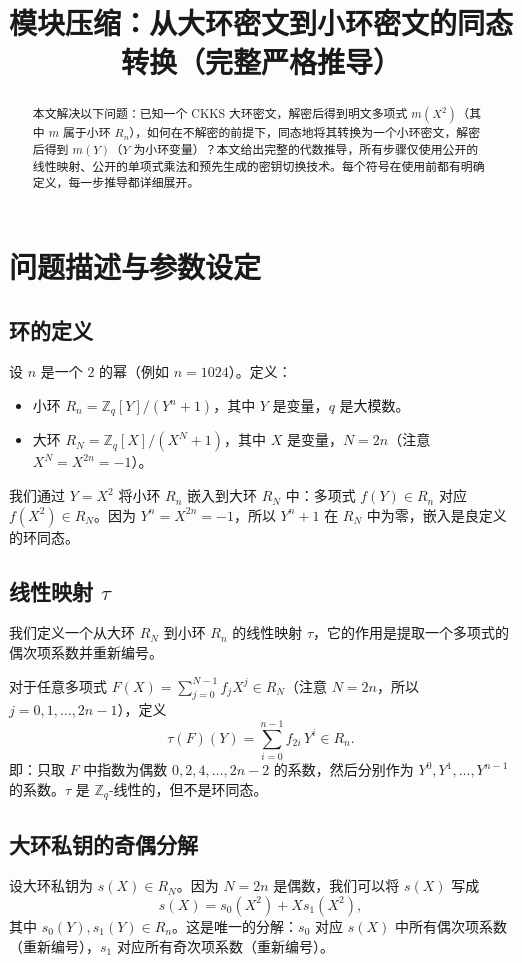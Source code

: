 \documentclass{article}
\title{模块压缩：从大环密文到小环密文的同态转换（完整严格推导）}
\author{}
\date{}
\begin{document}
\maketitle

\begin{abstract}
  本文解决以下问题：已知一个 CKKS 大环密文，解密后得到明文多项式 $m(X^2)$（其中 $m$ 属于小环 $R_n$），如何在不解密的前提下，同态地将其转换为一个小环密文，解密后得到 $m(Y)$（$Y$ 为小环变量）？本文给出完整的代数推导，所有步骤仅使用公开的线性映射、公开的单项式乘法和预先生成的密钥切换技术。每个符号在使用前都有明确定义，每一步推导都详细展开。
\end{abstract}

\section{问题描述与参数设定}

\subsection{环的定义}
设 $n$ 是一个 $2$ 的幂（例如 $n=1024$）。定义：
\begin{itemize}
  \item 小环 $R_n = \mathbb{Z}_q[Y] / (Y^n + 1)$，其中 $Y$ 是变量，$q$ 是大模数。
  \item 大环 $R_N = \mathbb{Z}_q[X] / (X^N + 1)$，其中 $X$ 是变量，$N = 2n$（注意 $X^N = X^{2n} = -1$）。
\end{itemize}
我们通过 $Y = X^2$ 将小环 $R_n$ 嵌入到大环 $R_N$ 中：多项式 $f(Y) \in R_n$ 对应 $f(X^2) \in R_N$。因为 $Y^n = X^{2n} = -1$，所以 $Y^n+1$ 在 $R_N$ 中为零，嵌入是良定义的环同态。

\subsection{线性映射 $\tau$}
我们定义一个从大环 $R_N$ 到小环 $R_n$ 的线性映射 $\tau$，它的作用是提取一个多项式的偶次项系数并重新编号。

对于任意多项式 $F(X) = \sum_{j=0}^{N-1} f_j X^j \in R_N$（注意 $N=2n$，所以 $j=0,1,\dots,2n-1$），定义
\[
\tau(F)(Y) = \sum_{i=0}^{n-1} f_{2i} \, Y^i \in R_n.
\]
即：只取 $F$ 中指数为偶数 $0,2,4,\dots,2n-2$ 的系数，然后分别作为 $Y^0, Y^1, \dots, Y^{n-1}$ 的系数。$\tau$ 是 $\mathbb{Z}_q$-线性的，但不是环同态。

\subsection{大环私钥的奇偶分解}
设大环私钥为 $s(X) \in R_N$。因为 $N=2n$ 是偶数，我们可以将 $s(X)$ 写成
\[
s(X) = s_0(X^2) + X s_1(X^2),
\]
其中 $s_0(Y), s_1(Y) \in R_n$。这是唯一的分解：$s_0$ 对应 $s(X)$ 中所有偶次项系数（重新编号），$s_1$ 对应所有奇次项系数（重新编号）。
\end{document}
